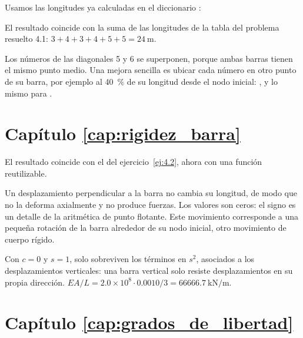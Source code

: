 
Usamos las longitudes ya calculadas en el diccionario :

El resultado coincide con la suma de las longitudes de la tabla del problema
resuelto 4.1: $3 + 4 + 3 + 4 + 5 + 5 = \SI{24}{\metre}$.

Los números de las diagonales 5 y 6 se superponen, porque ambas barras tienen
el mismo punto medio. Una mejora sencilla es ubicar cada número en otro punto
de su barra, por ejemplo al \SI{40}{\percent} de su longitud desde el nodo
inicial: , y lo
mismo para .

\section*{Capítulo \ref{cap:rigidez_barra}}

El resultado coincide con el del ejercicio~\ref{ej:4.2}, ahora con una
función reutilizable.

Un desplazamiento perpendicular a la barra no cambia su longitud, de modo que
no la deforma axialmente y no produce fuerzas. Los valores  son ceros:
el signo es un detalle de la aritmética de punto flotante. Este movimiento
corresponde a una pequeña rotación de la barra alrededor de su nodo inicial,
otro movimiento de cuerpo rígido.

Con $c = 0$ y $s = 1$, solo sobreviven los términos en $s^2$, asociados a
los desplazamientos verticales: una barra vertical solo resiste
desplazamientos en su propia dirección.
$EA/L = 2.0\times10^{8} \cdot 0.0010 / 3 = \SI{66666.7}{\kilo\newton\per\metre}$.


\section*{Capítulo \ref{cap:grados_de_libertad}}

